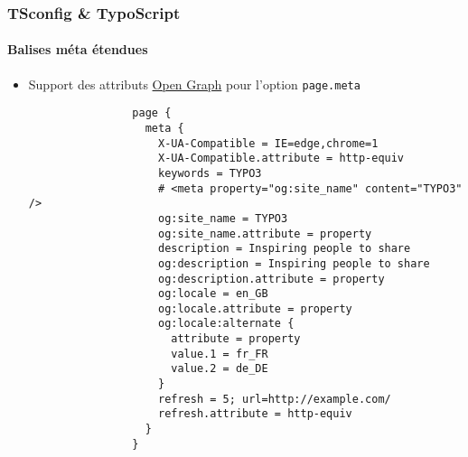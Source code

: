 \begin{frame}[fragile]
	\frametitle{TSconfig \& TypoScript}
	\framesubtitle{Balises méta étendues}

	\lstset{basicstyle=\tiny\ttfamily}

	\begin{itemize}


		\item Support des attributs \href{http://ogp.me}{Open Graph} pour l'option \texttt{page.meta}

			\begin{lstlisting}
				page {
				  meta {
				    X-UA-Compatible = IE=edge,chrome=1
				    X-UA-Compatible.attribute = http-equiv
				    keywords = TYPO3
				    # <meta property="og:site_name" content="TYPO3" />
				    og:site_name = TYPO3
				    og:site_name.attribute = property
				    description = Inspiring people to share
				    og:description = Inspiring people to share
				    og:description.attribute = property
				    og:locale = en_GB
				    og:locale.attribute = property
				    og:locale:alternate {
				      attribute = property
				      value.1 = fr_FR
				      value.2 = de_DE
				    }
				    refresh = 5; url=http://example.com/
				    refresh.attribute = http-equiv
				  }
				}
			\end{lstlisting}

	\end{itemize}

\end{frame}


